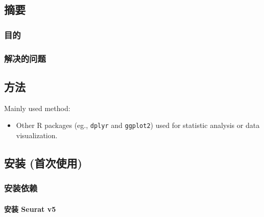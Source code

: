 \documentclass[
]{article}
\providecommand{\tightlist}{%
  \setlength{\itemsep}{0pt}\setlength{\parskip}{0pt}}
\begin{document}
\hypertarget{abstract}{%
\subsection{摘要}\label{abstract}}

\hypertarget{ux76eeux7684}{%
\subsubsection{目的}\label{ux76eeux7684}}

\hypertarget{ux89e3ux51b3ux7684ux95eeux9898}{%
\subsubsection{解决的问题}\label{ux89e3ux51b3ux7684ux95eeux9898}}

\hypertarget{ux65b9ux6cd5}{%
\subsection{方法}\label{ux65b9ux6cd5}}

Mainly used method:

\begin{itemize}
\tightlist
\item
  Other R packages (eg., \texttt{dplyr} and \texttt{ggplot2}) used for statistic analysis or data visualization.
\end{itemize}

\hypertarget{ux5b89ux88c5-ux9996ux6b21ux4f7fux7528}{%
\subsection{安装 (首次使用)}\label{ux5b89ux88c5-ux9996ux6b21ux4f7fux7528}}

\hypertarget{ux5b89ux88c5ux4f9dux8d56}{%
\subsubsection{安装依赖}\label{ux5b89ux88c5ux4f9dux8d56}}

\hypertarget{ux5b89ux88c5-seurat-v5}{%
\paragraph{安装 Seurat v5}\label{ux5b89ux88c5-seurat-v5}}
\end{document}
